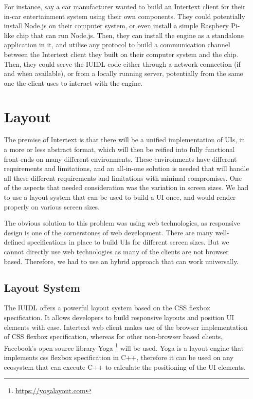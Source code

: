 For instance, say a car manufacturer wanted to build an Intertext client for their in-car entertainment system using their own components. They could potentially install Node.js on their computer system, or even install a simple Raspbery Pi-like chip that can run Node.js. Then, they can install the engine as a standalone application in it, and utilise any protocol to build a communication channel between the Intertext client they built on their computer system and the chip. Then, they could serve the IUIDL code either through a network connection (if and when available), or from a locally running server, potentially from the same one the client uses to interact with the engine. 

\section{Layout}

The premise of Intertext is that there will be a unified implementation of UIs, in a more or less abstract format, which will then be reified into fully functional front-ends on many different environments. These environments have different requirements and limitations, and an all-in-one solution is needed that will handle all these different requirements and limitations with minimal compromises. One of the aspects that needed consideration was the variation in screen sizes. We had to use a layout system that can be used to build a UI once, and would render properly on various screen sizes.

The obvious solution to this problem was using web technologies, as responsive design is one of the cornerstones of web development. There are many well-defined specifications in place to build UIs for different screen sizes. But we cannot directly use web technologies as many of the clients are not browser based. Therefore, we had to use an hybrid approach that can work universally.

\subsection{Layout System}

The IUIDL offers a powerful layout system based on the CSS flexbox specification. It allows developers to build responsive layouts and position UI elements with ease. Intertext web client makes use of the browser implementation of CSS flexbox specification, whereas for other non-browser based clients, Facebook's open source library Yoga \footnote{\url{https://yogalayout.com}} will be used. Yoga is a layout engine that implements css flexbox specification in C++, therefore it can be used on any ecosystem that can execute C++ to calculate the positioning of the UI elements.


